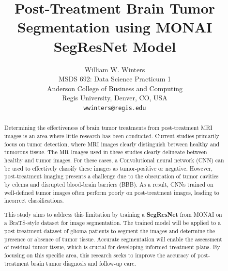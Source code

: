 \documentclass[12pt, onecolumn]{IEEEtran}
\begin{document}
\title{Post-Treatment Brain Tumor Segmentation using MONAI SegResNet Model}

\author{William W. Winters \\
MSDS 692: Data Science Practicum 1 \\
Anderson College of Business and Computing \\
Regis University, Denver, CO, USA \\
\texttt{wwinters@regis.edu}}


\maketitle


\begin{abstract}
Determining the effectiveness of brain tumor treatments from post-treatment MRI images is an area where little research has been conducted.  Current studies primarily focus on tumor detection, where MRI images clearly distinguish between healthy and tumorous tissue.  The MR Images used in these studies clearly delineate between healthy and tumor images.  For these cases, a Convolutional neural network (CNN) can be used to effectively classify these images as tumor-positive or negative.  However, post-treatment imaging presents a challenge due to the obscuration of tumor cavities by edema and disrupted blood-brain barriers (BBB).  As a result, CNNs trained on well-defined tumor images often perform poorly on post-treatment images, leading to incorrect classifications. 

This study aims to address this limitation by training a \textbf{SegResNet} from MONAI on a BraTS-style dataset for image segmentation.  The trained model will be applied to a post-treatment dataset of glioma patients to segment the images and determine the presence or absence of tumor tissue.  Accurate segmentation will enable the assessment of residual tumor tissue, which is crucial for developing informed treatment plans.  By focusing on this specific area, this research seeks to improve the accuracy of post-treatment brain tumor diagnosis and follow-up care.
\end{abstract}
\end{document}

